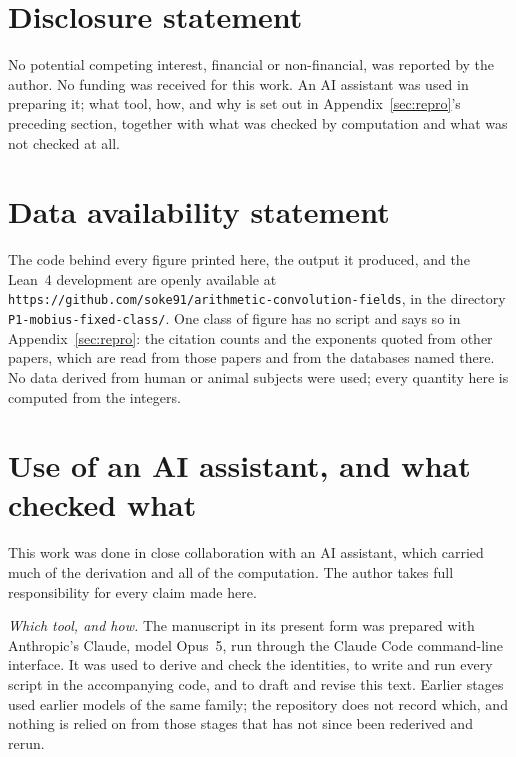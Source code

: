 \documentclass[11pt,a4paper]{article}
\theoremstyle{plain}
\theoremstyle{definition}
\theoremstyle{remark}
\begin{document}
\section*{Disclosure statement}

No potential competing interest, financial or non-financial, was
reported by the author. No funding was received for this work. An AI
assistant was used in preparing it; what tool, how, and why is set out
in Appendix~\ref{sec:repro}'s preceding section, together with what was
checked by computation and what was not checked at all.

\section*{Data availability statement}

The code behind every figure printed here, the output it produced, and
the Lean~4 development are openly available at
\texttt{https://github.com/soke91/arithmetic-convolution-fields}, in the
directory \texttt{P1-mobius-fixed-class/}. One class of figure has no
script and says so in Appendix~\ref{sec:repro}: the citation counts and
the exponents quoted from other papers, which are read from those papers
and from the databases named there. No data derived from human or animal
subjects were used; every quantity here is computed from the integers.

\appendix
\section{Use of an AI assistant, and what checked what}

This work was done in close collaboration with an AI assistant, which
carried much of the derivation and all of the computation. The author
takes full responsibility for every claim made here.

\emph{Which tool, and how.} The manuscript in its present form was
prepared with Anthropic's Claude, model Opus~5, run through the Claude
Code command-line interface. It was used to derive and check the
identities, to write and run every script in the accompanying code, and
to draft and revise this text. Earlier stages used earlier models of the
same family; the repository does not record which, and nothing is relied
on from those stages that has not since been rederived and rerun.
\end{document}
